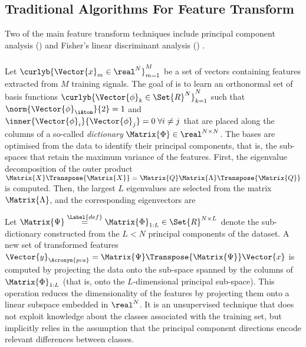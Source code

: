 \documentclass{article}
\def \nComponents{L} 	%
\def \fea{\Vector{x}} 	%
\def \iFea{n}	 		%
\def \nDim{N} 			%
\def \newFea{\Vector{y}} 	%
\def \Dic{\Matrix{\Phi}} %
\def \iAto{k} 			%
\def \atom{\Vector{\phi}}%
\def \nFea{M}			%
\def \iFea{m}			%
\def \definition{\overset{\Label{def}}{=}}	%
\def \ambient{\Set{R}} 						%
\def \Spa{\Matrix{\Psi}}
\begin{document}
\subsection{Traditional Algorithms For Feature Transform}\label{sec:aft}
Two of the main feature transform techniques include principal component analysis () \cite{Pearson1901On} and Fisher's linear discriminant analysis () \cite{Duda1973Pa}.

\subsubsection{}
Let $\curlyb{\fea_{\iFea} \in \real^{\nDim}}_{\iFea=1}^{\nFea}$ be a set of vectors containing features extracted from $\nFea$ training signals. The goal of  is to learn an orthonormal set of basis functions $\curlyb{\atom_{\iAto} \in \ambient^{\nDim}}_{\iAto=1}^{\nDim}$ such that $ \norm{\atom_{\iAtom}}{2}=1$ and $\inner{\atom_{i}}{\atom_{j}}=0 \; \forall i\neq j$ that are placed along the columns of a so-called \emph{dictionary} $\Dic\in\real^{\nDim\times\nDim}$. The bases are optimised from the data to identify their principal components, that is, the sub-spaces that retain the maximum variance of the features. First, the eigenvalue decomposition of the outer product $\Matrix{X}\Transpose{\Matrix{X}} = \Matrix{Q}\Matrix{\Lambda}\Transpose{\Matrix{Q}}$ is computed. Then, the largest $\nComponents$ eigenvalues are selected from the matrix $\Matrix{\Lambda}$, and the corresponding eigenvectors are   

Let $\Spa\definition\Dic_{1:\nComponents}\in\ambient^{\nDim\times\nComponents}$ denote the sub-dictionary constructed from the $\nComponents<\nDim$ principal components of the dataset. A new set of transformed features $\newFea_{\Acronym{pca}} = \Spa\Transpose{\Spa}\fea$ is computed by projecting the data onto the sub-space spanned by the columns of $\Dic_{1:\nComponents}$ (that is, onto the $\nComponents$-dimensional principal sub-space). This operation reduces the dimensionality of the features by projecting them onto a linear subspace embedded in $\real^{\nDim}$. It is an unsupervised technique that does not exploit knowledge about the classes associated with the training set, but implicitly relies in the assumption that the principal component directions encode relevant differences between classes.
\end{document}
